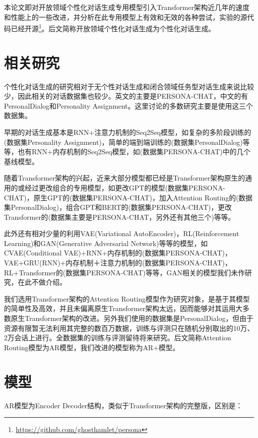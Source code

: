 \documentclass[letterpaper]{article} %
\DeclareRobustCommand{\citeext}[1]{\cite[#1]{#1}}
\begin{document}
\begin{CJK*}{UTF8}{gbsn}
本论文即对开放领域个性化对话生成专用模型\citeext{Zheng2019}引入Transformer架构近几年的速度和性能上的一些改进，并分析在此专用模型上有效和无效的各种尝试，实验的源代码已经开源\footnote{\url{https://github.com/ghosthamlet/persona}}。后文简称开放领域个性化对话生成为个性化对话生成。

\section[Related Works]{相关研究} 
个性化对话生成的研究相对于无个性对话生成和闭合领域任务型对话生成来说比较少，因此相关的对话数据集也较少。英文的主要是PERSONA-CHAT\citeext{Zhang2018}，中文的有PersonalDialog\citeext{Zheng2019a}和Personality Assignment\citeext{Qian2017}。这里讨论的多数研究主要是使用这三个数据集。

早期的对话生成基本是RNN+注意力机制\citeext{Bahdanau2015}的Seq2Seq模型\citeext{SutskeverGoogle2014}，如复杂的多阶段训练的\citeext{Qian2017}(数据集Personality Assignment)，简单的端到端训练的\citeext{Zheng2019a}(数据集PersonalDialog)等等，也有RNN+内存机制\citeext{Sukhbaatar2015}的Seq2Seq模型，如\citeext{Zhang2018}(数据集PERSONA-CHAT)中的几个基线模型。

随着Transformer架构的兴起，近来大部分模型都已经是Transformer架构原生的通用的或经过更改组合的专用模型，如更改GPT\citeext{Radford2018}的模型\citeext{Tselousov2018}(数据集PERSONA-CHAT)，原生GPT的\citeext{Wolf2019}(数据集PERSONA-CHAT)，加入Attention Routing的\citeext{Zheng2019}(数据集PersonalDialog)，组合GPT和BERT的\citeext{Liu2020}(数据集PERSONA-CHAT)，更改Transformer的\citeext{Roller2020}(数据集主要是PERSONA-CHAT，另外还有其他三个)等等。

此外还有相对少量的利用VAE(Variational AutoEncoder)，RL(Reinforcement Learning)和GAN(Generative Adversarial Network)等等的模型，如CVAE(Conditional VAE)+RNN+内存机制的\citeext{Song2019}(数据集PERSONA-CHAT)，VAE+GRU(RNN)+内存机制＋注意力机制的\citeext{Xu2020}(数据集PERSONA-CHAT)，RL+Transformer的\citeext{Liu2020}(数据集PERSONA-CHAT)等等，GAN相关的模型我们未作研究，在此不做介绍。

我们选用Transformer架构的Attention Routing模型\citeext{Zheng2019}作为研究对象，是基于其模型的简单性及高效，并且未偏离原生Transformer架构太远，因而能够对其运用大多数原生Transformer架构的改进。另外我们使用的数据集是PersonalDialog，但由于资源有限暂无法利用其完整的数百万数据，训练与评测只在随机分别取出的10万、2万会话上进行。全数据集的训练与评测留待将来研究。后文简称Attention Routing模型为AR模型，我们改进的模型称为AR+模型。

\section[Model]{模型} 
AR模型为Encoder Decoder结构，类似于Transformer架构的完整版\citeext{Vaswani2017}，区别是：


\end{CJK*}
\end{document}
